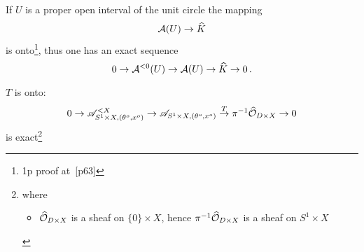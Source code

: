 \begin{paracol}{2} %
  \begin{lem}
    If $U$ is a proper open interval of the unit circle the mapping
    \[
      \mathcal{A}(U)\to\widehat{K}
    \]
    is onto\footnote{1p proof at~\cite{sabbah_cimpa90}[p63]}, thus one has an
    exact sequence
    \[
      0 \to \mathcal{A}^{<0}(U) \to \mathcal{A}(U) \to \widehat{K} \to 0 \,.
    \]
  \end{lem}

  \switchcolumn{} %
  \begin{lem}
    $T$ is onto:
    \[
      0 \to              \mathscr{A}_{S^1\times X,(\theta^o,x^o)}^{<X}
        \to              \mathscr{A}_{S^1\times X,(\theta^o,x^o)}
        \overset{T}{\to} \pi^{-1}\widehat{\mathcal{O}}_{D\times X}
        \to 0
    \]
    is exact\footnote{where
      \begin{itemize}
        \item $\widehat{\mathcal{O}}_{D\times X}$ is a sheaf on $\{0\}\times X$, hence
          $\pi^{-1}\widehat{\mathcal{O}}_{D\times X}$ is a sheaf on $S^1\times X$
      \end{itemize}
    }
  \end{lem}

\end{paracol} %

